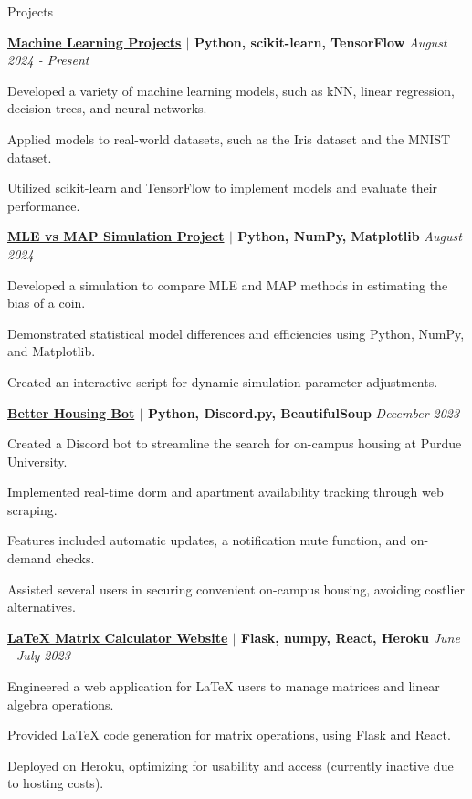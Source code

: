 \documentclass[
    11pt, %
]{resume} %
\begin{document}
\vspace*{-0.3cm}
\begin{rSection}{Projects}
\vspace*{-0.3cm}
\begin{rSubsection}{}{}{\bf \href{}{Machine Learning Projects} $\mid$ Python, scikit-learn, TensorFlow }{\hfill \em August 2024 - Present}
    \item Developed a variety of machine learning models, such as kNN, linear regression, decision trees, and neural networks.
    \item Applied models to real-world datasets, such as the Iris dataset and the MNIST dataset.
    \item Utilized scikit-learn and TensorFlow to implement models and evaluate their performance.
\end{rSubsection}
\begin{rSubsection}{}{}{\bf \href{https://github.com/maxinimus/MLEvsMAP}{MLE vs MAP Simulation Project} $\mid$ Python, NumPy, Matplotlib }{\hfill \em August 2024}
    \item Developed a simulation to compare MLE and MAP methods in estimating the bias of a coin.
    \item Demonstrated statistical model differences and efficiencies using Python, NumPy, and Matplotlib.
    \item Created an interactive script for dynamic simulation parameter adjustments.
\end{rSubsection}
\begin{rSubsection}{}{}{\bf \href{https://github.com/maxinimus/better-housing-bot}{Better Housing Bot} $\mid$ Python, Discord.py, BeautifulSoup }{\hfill \em December 2023}
    \item Created a Discord bot to streamline the search for on-campus housing at Purdue University.
    \item Implemented real-time dorm and apartment availability tracking through web scraping.
    \item Features included automatic updates, a notification mute function, and on-demand checks.
    \item Assisted several users in securing convenient on-campus housing, avoiding costlier alternatives.
\end{rSubsection}
\begin{rSubsection}{}{}{\bf \href{https://github.com/maxinimus/LaTeX-Matrix-Calculator}{LaTeX Matrix Calculator Website} $\mid$ Flask, numpy, React, Heroku }{ \hfill \em June - July 2023}
    \item Engineered a web application for LaTeX users to manage matrices and linear algebra operations.
    \item Provided LaTeX code generation for matrix operations, using Flask and React.
    \item Deployed on Heroku, optimizing for usability and access (currently inactive due to hosting costs).
\end{rSubsection}

\end{rSection}
\vspace*{-0.3cm}
\end{document}
